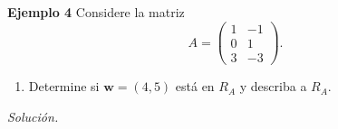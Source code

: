 \subsection{}

\begin{frame}%


\vspace{0mm}

\begin{ej}{\textbf{Ejemplo  4}}
	Considere la matriz
	\[
	A = 
	\left( 
	\begin{array}{rr}	
	1 & -1  \\
	0 &  1 \\
	3 & -3
	\end{array} 
	\right).
	\]
	\begin{enumerate}
		\item[\labelname{$b$}] Determine si $\mathbf{w} = (4, 5)$ está en $R_A$ y describa a $R_A$.
	\end{enumerate}
\end{ej}
\textit{Solución.}

\end{frame}

